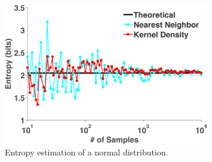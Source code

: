 \documentclass[10pt,twocolumn,letterpaper]{article}
\begin{document}






\begin{figure}
\begin{center}
   \includegraphics[width=0.8\textwidth]{gaussian_1D.png}
   \caption{Entropy estimation of a normal distribution.}
\end{center}
\label{fig:g1d}
\end{figure}
\end{document}
